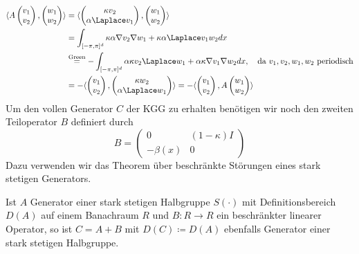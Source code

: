 \begin{align*}
\langle A\begin{pmatrix}v_1\\v_2\end{pmatrix}, \begin{pmatrix}w_1\\w_2\end{pmatrix}\rangle
&=\langle \begin{pmatrix}\kappa v_2\\\alpha \Laplace v_1\end{pmatrix}, \begin{pmatrix}w_1\\w_2\end{pmatrix}\rangle\\
&=\int_{[-\pi,\pi]^d}\kappa \alpha \nabla v_2\nabla w_1 + \kappa \alpha \Laplace v_1 w_2dx\\
&\stackrel{\text{Green}}{=}-\int_{[-\pi,\pi]^d}\alpha\kappa v_2\Laplace w_1+ \alpha\kappa \nabla v_1\nabla w_2dx,\quad \text{da $v_1,v_2,w_1,w_2$ periodisch}\\
&=-\langle \begin{pmatrix} v_1\\ v_2\end{pmatrix}, \begin{pmatrix}\kappa w_2\\\alpha \Laplace w_1\end{pmatrix}\rangle=-\langle \begin{pmatrix}v_1\\v_2\end{pmatrix}, A\begin{pmatrix}w_1\\w_2\end{pmatrix}\rangle
\end{align*}
Um den vollen Generator $C$ der KGG zu erhalten benötigen wir noch den zweiten Teiloperator $B$ definiert durch
\[B=\begin{pmatrix}0 & (1-\kappa)I\\-\beta(x) & 0\end{pmatrix}\]
Dazu verwenden wir das Theorem über beschränkte Störungen eines stark stetigen Generators.
\begin{maththeorem}
Ist $A$ Generator einer stark stetigen Halbgruppe $S(\cdot)$ mit Definitionsbereich $D(A)$ auf einem Banachraum $R$ und $B\colon R\to R$ ein beschränkter linearer Operator, so ist
$C=A+B$ mit $D(C)\coloneqq D(A)$ ebenfalls Generator einer stark stetigen Halbgruppe.
\end{maththeorem}
